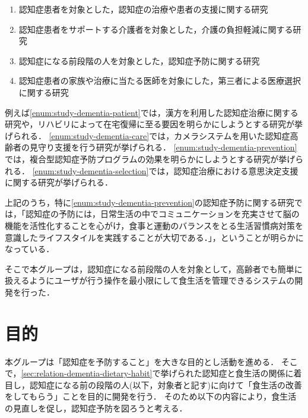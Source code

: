 \documentclass[../report]{subfiles}
\begin{document}
\begin{enumerate}
    \item \label{enum:study-dementia-patient} 認知症患者を対象とした，認知症の治療や患者の支援に関する研究
    \item \label{enum:study-dementia-care} 認知症患者をサポートする介護者を対象とした，介護の負担軽減に関する研究
    \item \label{enum:study-dementia-prevention} 認知症になる前段階の人を対象とした，認知症予防に関する研究
    \item \label{enum:study-dementia-selection} 認知症患者の家族や治療に当たる医師を対象にした，第三者による医療選択に関する研究
\end{enumerate}

例えば\ref{enum:study-dementia-patient}では，漢方を利用した認知症治療に関する研究\cite{dementia-prevention-with-chinese-medicine}や，リハビリによって在宅復帰に至る要因を明らかにしようとする研究\cite{rehabilitation}が挙げられる．
\ref{enum:study-dementia-care}では，カメラシステムを用いた認知症高齢者の見守り支援を行う研究\cite{camera-system}が挙げられる．
\ref{enum:study-dementia-prevention}では，複合型認知症予防プログラムの効果を明らかにしようとする研究\cite{dementia-prevention-with-some-programs}が挙げられる．
\ref{enum:study-dementia-selection}では，認知症治療における意思決定支援に関する研究\cite{medical-choice}が挙げられる．

上記のうち，特に\ref{enum:study-dementia-prevention}の認知症予防に関する研究では，「認知症の予防には，日常生活の中でコミュニケーションを充実させて脳の機能を活性化することを心がけ，食事と運動のバランスをとる生活習慣病対策を意識したライフスタイルを実践することが大切である．」\cite{dementia-prevention}，ということが明らかになっている．

そこで本グループは，認知症になる前段階の人を対象として，高齢者でも簡単に扱えるようにユーザが行う操作を最小限にして食生活を管理できるシステムの開発を行った．


\section{目的} \label{sec:objective}
本グループは「認知症を予防すること」を大きな目的とし活動を進める．
そこで，\ref{sec:relation-dementia-dietary-habit}で挙げられた認知症と食生活の関係に着目し，認知症になる前の段階の人(以下，対象者と記す)に向けて「食生活の改善をしてもらう」ことを目的に開発を行う．
そのため以下の内容により，食生活の見直しを促し，認知症予防を図ろうと考える．
\end{document}
